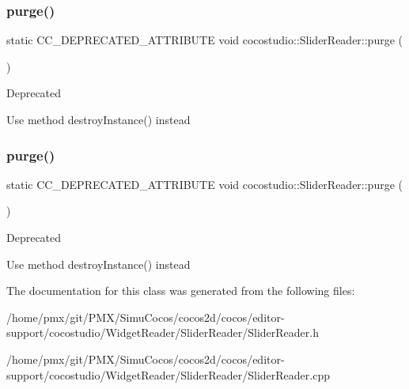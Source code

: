 \subsubsection{\texorpdfstring{purge()}{purge()}\hspace{0.1cm}{\footnotesize\ttfamily [1/2]}}
{\footnotesize\ttfamily static C\+C\+\_\+\+D\+E\+P\+R\+E\+C\+A\+T\+E\+D\+\_\+\+A\+T\+T\+R\+I\+B\+U\+TE void cocostudio\+::\+Slider\+Reader\+::purge (\begin{DoxyParamCaption}{ }\end{DoxyParamCaption})\hspace{0.3cm}{\ttfamily [static]}}

\begin{DoxyRefDesc}{Deprecated}
\item[\hyperlink{deprecated__deprecated000104}{Deprecated}]Use method destroy\+Instance() instead \end{DoxyRefDesc}
\mbox{\label{classcocostudio_1_1SliderReader_a7db674d5977ceae94f2fa14195d06545}} 
\subsubsection{\texorpdfstring{purge()}{purge()}\hspace{0.1cm}{\footnotesize\ttfamily [2/2]}}
{\footnotesize\ttfamily static C\+C\+\_\+\+D\+E\+P\+R\+E\+C\+A\+T\+E\+D\+\_\+\+A\+T\+T\+R\+I\+B\+U\+TE void cocostudio\+::\+Slider\+Reader\+::purge (\begin{DoxyParamCaption}{ }\end{DoxyParamCaption})\hspace{0.3cm}{\ttfamily [static]}}

\begin{DoxyRefDesc}{Deprecated}
\item[\hyperlink{deprecated__deprecated000339}{Deprecated}]Use method destroy\+Instance() instead \end{DoxyRefDesc}


The documentation for this class was generated from the following files\+:\begin{DoxyCompactItemize}
\item 
/home/pmx/git/\+P\+M\+X/\+Simu\+Cocos/cocos2d/cocos/editor-\/support/cocostudio/\+Widget\+Reader/\+Slider\+Reader/Slider\+Reader.\+h\item 
/home/pmx/git/\+P\+M\+X/\+Simu\+Cocos/cocos2d/cocos/editor-\/support/cocostudio/\+Widget\+Reader/\+Slider\+Reader/Slider\+Reader.\+cpp\end{DoxyCompactItemize}
